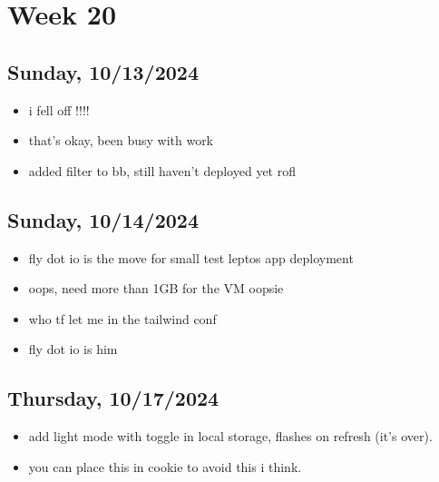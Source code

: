 \newpage
\section{Week 20}

\subsection*{Sunday, 10/13/2024}
\begin{itemize}
    \item i fell off !!!!
    \item that's okay, been busy with work
    \item added filter to bb, still haven't deployed yet rofl
\end{itemize}

\subsection*{Sunday, 10/14/2024}
\begin{itemize}
    \item fly dot io is the move for small test leptos app deployment
    \item oops, need more than 1GB for the VM oopsie
    \item who tf let me in the tailwind conf
    \item fly dot io is him
\end{itemize}

\subsection*{Thursday, 10/17/2024}
\begin{itemize}
    \item add light mode with toggle in local storage, flashes on refresh (it's
        over).
    \item you can place this in cookie to avoid this i think.
\end{itemize}
